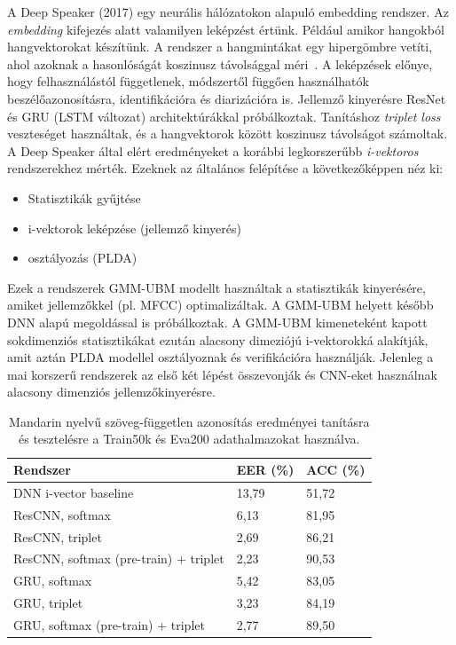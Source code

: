 A Deep Speaker (2017) egy neurális hálózatokon alapuló embedding rendszer. Az \emph{embedding} kifejezés alatt valamilyen leképzést értünk. Például amikor hangokból hangvektorokat készítünk. A rendszer a hangmintákat egy hipergömbre vetíti, ahol azoknak a hasonlóságát koszinusz távolsággal méri~\cite{deep_speaker}.
\newline
\newline
A leképzések előnye, hogy felhasználástól függetlenek, módszertől függően használhatók beszélőazonosításra, identifikációra és diarizációra is. 
\newline
\newline
Jellemző kinyerésre ResNet és GRU (LSTM változat) architektúrákkal próbálkoztak. Tanításhoz \emph{triplet loss} veszteséget használtak, és a hangvektorok között koszinusz távolságot számoltak.
\newline
\newline
A Deep Speaker által elért eredményeket a korábbi legkorszerűbb \emph{i-vektoros} rendszerekhez mérték.
Ezeknek az általános felépítése a következőképpen néz ki:
\begin{itemize}
	\item Statisztikák gyűjtése
	\item i-vektorok leképzése (jellemző kinyerés)
	\item osztályozás (PLDA)
\end{itemize} 
Ezek a rendszerek GMM-UBM modellt használtak a statisztikák kinyerésére, amiket jellemzőkkel (pl. MFCC) optimalizáltak. A GMM-UBM helyett később
DNN alapú megoldással is próbálkoztak. A GMM-UBM kimeneteként kapott
sokdimenziós statisztikákat ezután alacsony dimeziójú i-vektorokká alakítják, amit aztán PLDA modellel osztályoznak és verifikációra használják.
Jelenleg a mai korszerű rendszerek az első két lépést összevonják és CNN-eket használnak alacsony dimenziós jellemzőkinyerésre.
\begin{table}[!ht]
	\begin{tabular}{*3l} \toprule
		\bfseries Rendszer & \bfseries EER (\%) & \bfseries ACC (\%) \\ \midrule
		DNN i-vector baseline & 13,79 & 51,72 \\
		\rowcolor{gray!10}
		ResCNN, softmax & 6,13 & 81,95 \\
		ResCNN, triplet & 2,69 & 86,21 \\
		\rowcolor{gray!10}
		ResCNN, softmax (pre-train) + triplet & 2,23 & 90,53 \\
		GRU, softmax & 5,42 & 83,05 \\
		GRU, triplet & 3,23 & 84,19 \\
		\rowcolor{gray!10}
		GRU, softmax (pre-train) + triplet & 2,77 & 89,50 \\
		\bottomrule
		\hline
	\end{tabular}
	\centering
	\caption{Mandarin nyelvű szöveg-független azonosítás eredményei tanításra és tesztelésre a Train50k és Eva200 adathalmazokat használva.}
	\label{fig:deep-speaker-independent-mandarin-results}
\end{table}
